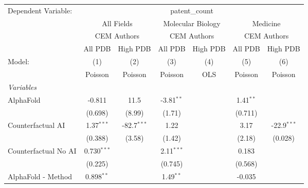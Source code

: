 \begingroup
\centering
\begin{tabular}{lcccccc}
   \tabularnewline \midrule \midrule
   Dependent Variable: & \multicolumn{6}{c}{patent\_count}\\
 & \multicolumn{2}{c}{All Fields} & \multicolumn{2}{c}{Molecular Biology} & \multicolumn{2}{c}{Medicine} \\
\cmidrule(lr){2-3} \cmidrule(lr){4-5} \cmidrule(lr){6-7}
 & \multicolumn{2}{c}{CEM Authors} & \multicolumn{2}{c}{CEM Authors} & \multicolumn{2}{c}{CEM Authors} \\
\cmidrule(lr){2-3} \cmidrule(lr){4-5} \cmidrule(lr){6-7}
 & \multicolumn{1}{c}{All PDB} & \multicolumn{1}{c}{High PDB} & \multicolumn{1}{c}{All PDB} & \multicolumn{1}{c}{High PDB} & \multicolumn{1}{c}{All PDB} & \multicolumn{1}{c}{High PDB} \\
\cmidrule(lr){2-2} \cmidrule(lr){3-3} \cmidrule(lr){4-4} \cmidrule(lr){5-5} \cmidrule(lr){6-6} \cmidrule(lr){7-7}
   Model:                                                     & (1)           & (2)           & (3)           & (4)  & (5)           & (6)\\  
                                                              &  Poisson      & Poisson       & Poisson       & OLS  & Poisson       & Poisson\\  
   \midrule
   \emph{Variables}\\
   AlphaFold                                                  & -0.811        & 11.5          & -3.81$^{**}$  &      & 1.41$^{**}$   &   \\   
                                                              & (0.698)       & (8.99)        & (1.71)        &      & (0.711)       &   \\   
   Counterfactual AI                                          & 1.37$^{***}$  & -82.7$^{***}$ & 1.22          &      & 3.17          & -22.9$^{***}$\\   
                                                              & (0.388)       & (3.58)        & (1.42)        &      & (2.18)        & (0.028)\\   
   Counterfactual No AI                                       & 0.730$^{***}$ &               & 2.11$^{***}$  &      & 0.183         &   \\   
                                                              & (0.225)       &               & (0.745)       &      & (0.568)       &   \\   
   AlphaFold - Method                                         & 0.898$^{**}$  &               & 1.49$^{**}$   &      & -0.035        &   \\   

\end{tabular}
